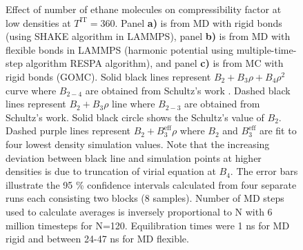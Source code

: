\documentclass[5p,times]{elsarticle}
\begin{document}
\begin{figure}
\caption{ Effect of number of ethane molecules on compressibility factor at low densities at $T^{\mathrm{IT}}=360$. Panel \textbf{a)} is from MD with rigid bonds (using SHAKE algorithm \cite{Ryckaert1977} in LAMMPS), panel \textbf{b)} is from MD with flexible bonds in LAMMPS (harmonic potential using multiple-time-step algorithm RESPA \cite{tuckerman1992} algorithm), and panel \textbf{c)} is from MC with rigid bonds (GOMC). 
Solid black lines represent $B_2+B_3 \rho+B_4 \rho^2$ curve where $B_{2-4}$ are obtained from Schultz's work \cite{Schultz2010a}. Dashed black lines represent $B_2+B_3 \rho$ line where $B_{2-3}$ are obtained from Schultz's work. Solid black circle shows the Schultz's value of $B_2$. Dashed purple lines represent $B_2+B_3^\mathrm{eff}\rho$ where $B_2$ and $B_3^\mathrm{eff}$ are fit to four lowest density simulation values. Note that the increasing  deviation between black line and simulation points at higher densities is due to truncation of virial equation at $B_4$. The error bars illustrate the 95 \% confidence intervals calculated from four separate runs each consisting two blocks (8 samples). Number of MD steps used to calculate averages is inversely proportional to N with 6 million timesteps for N=120. Equilibration times were 1 ns for MD rigid and between 24-47 ns for MD flexible.
}
\label{fig:FSE_TraPPE_C2_abc}
\end{figure}
\end{document}
